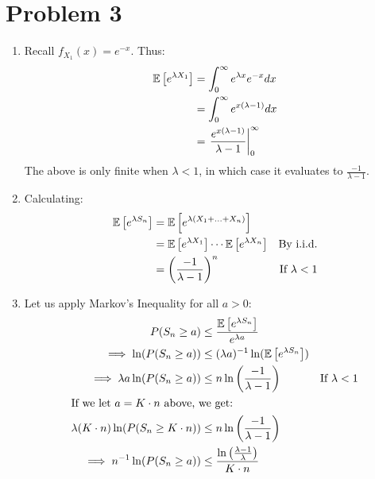 \documentclass{article}
\begin{document}
\section*{Problem 3}
\begin{enumerate}[label=(\alph*)]
\item Recall $f_{X_1}(x) = e^{-x}$. Thus:
\begin{align*}
    \mathbb{E}\left[e^{\lambda X_1}\right] &= \int_0^\infty e^{\lambda x} e^{-x}dx \\
    &= \int_0^\infty e^{x(\lambda - 1)}dx \\
    &= \left. \frac{e^{x(\lambda - 1)}}{\lambda - 1} \right\vert_0^\infty
\end{align*}
The above is only finite when $\lambda < 1$, in which case it evaluates to $\frac{-1}{\lambda - 1}$.

\item Calculating:
\begin{align*}
    \mathbb{E}\left[e^{\lambda S_n}\right] &= \mathbb{E}\left[e^{\lambda(X_1 + \ldots + X_n)}\right] \\
    &= \mathbb{E}\left[e^{\lambda X_1}\right] \cdots \mathbb{E}\left[e^{\lambda X_n}\right] &\text{By i.i.d.}\\
    &= \left(\frac{-1}{\lambda - 1}\right)^n &\text{If $\lambda < 1$}
\end{align*}

\item Let us apply Markov's Inequality for all $a > 0$:
\begin{align*}
    P(S_n \geq a) &\leq \frac{\mathbb{E}\left[e^{\lambda S_n}\right]}{e^{\lambda a}} \\
    \implies \ln(P(S_n \geq a)) &\leq (\lambda a)^{-1} \ln(\mathbb{E}\left[e^{\lambda S_n}\right])\\
    \implies \lambda a \ln(P(S_n \geq a)) &\leq n \ln\left(\frac{-1}{\lambda - 1}\right) &\text{If $\lambda < 1$} \\
    \intertext{If we let $a = K\cdot n$ above, we get:} 
    \lambda (K\cdot n) \ln(P(S_n \geq K\cdot n)) &\leq n \ln\left(\frac{-1}{\lambda - 1}\right) \\
    \implies n^{-1} \ln(P(S_n \geq a)) &\leq \frac{\ln\left(\frac{\lambda - 1}{\lambda}\right)}{K\cdot n}
\end{align*}
\end{enumerate}
\end{document}
